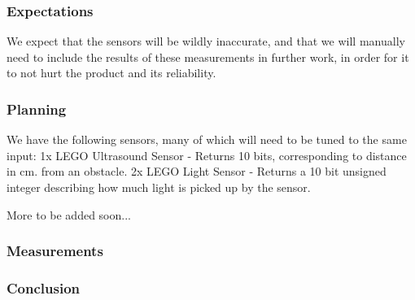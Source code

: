 
\subsubsection{Expectations}
We expect that the sensors will be wildly inaccurate, and that we will manually need to include the results of these measurements in further work, in order for it to not hurt the product and its reliability.

\subsubsection{Planning}
We have the following sensors, many of which will need to be tuned to the same input:
1x LEGO Ultrasound Sensor
- Returns 10 bits, corresponding to distance in cm. from an obstacle.
2x LEGO Light Sensor
- Returns a 10 bit unsigned integer describing how much light is picked up by the sensor.

More to be added soon...

\subsubsection{Measurements}






\subsubsection{Conclusion}
